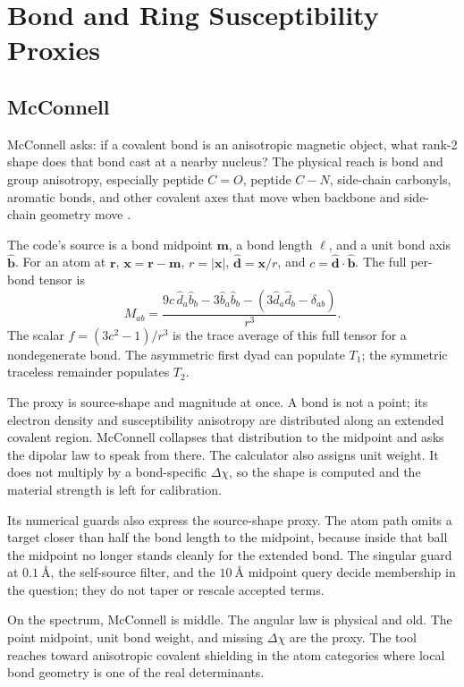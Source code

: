 \documentclass[11pt]{article}
\begin{document}
\section{Bond and Ring Susceptibility Proxies}

\subsection{McConnell}

McConnell asks: if a covalent bond is an anisotropic magnetic object, what
rank-2 shape does that bond cast at a nearby nucleus? The physical reach is
bond and group anisotropy, especially peptide \(C=O\), peptide \(C-N\),
side-chain carbonyls, aromatic bonds, and other covalent axes that move when
backbone and side-chain geometry move \cite{mcconnell1957,dedios1993}.

The code's source is a bond midpoint \(\bm m\), a bond length \(\ell\), and a
unit bond axis \(\hat{\bm b}\). For an atom at \(\bm r\),
\(\bm x=\bm r-\bm m\), \(r=|\bm x|\),
\(\hat{\bm d}=\bm x/r\), and
\(c=\hat{\bm d}\cdot\hat{\bm b}\). The full per-bond tensor is
\[
  M_{ab}
  =
  \frac{
    9c\,\hat d_a\hat b_b
    -3\hat b_a\hat b_b
    -\left(3\hat d_a\hat d_b-\delta_{ab}\right)}
  {r^3}.
\]
The scalar \(f=(3c^2-1)/r^3\) is the trace average of this full tensor for a
nondegenerate bond. The asymmetric first dyad can populate \(T_1\); the
symmetric traceless remainder populates \(T_2\).

The proxy is source-shape and magnitude at once. A bond is not a point; its
electron density and susceptibility anisotropy are distributed along an
extended covalent region. McConnell collapses that distribution to the midpoint
and asks the dipolar law to speak from there. The calculator also assigns unit
weight. It does not multiply by a bond-specific \(\Delta\chi\), so the shape is
computed and the material strength is left for calibration.

Its numerical guards also express the source-shape proxy. The atom path omits a
target closer than half the bond length to the midpoint, because inside that
ball the midpoint no longer stands cleanly for the extended bond. The singular
guard at \(\SI{0.1}{\angstrom}\), the self-source filter, and the
\(\SI{10}{\angstrom}\) midpoint query decide membership in the question; they
do not taper or rescale accepted terms.

On the spectrum, McConnell is middle. The angular law is physical and old. The
point midpoint, unit bond weight, and missing \(\Delta\chi\) are the proxy.
The tool reaches toward anisotropic covalent shielding in the atom categories
where local bond geometry is one of the real determinants.
\end{document}
